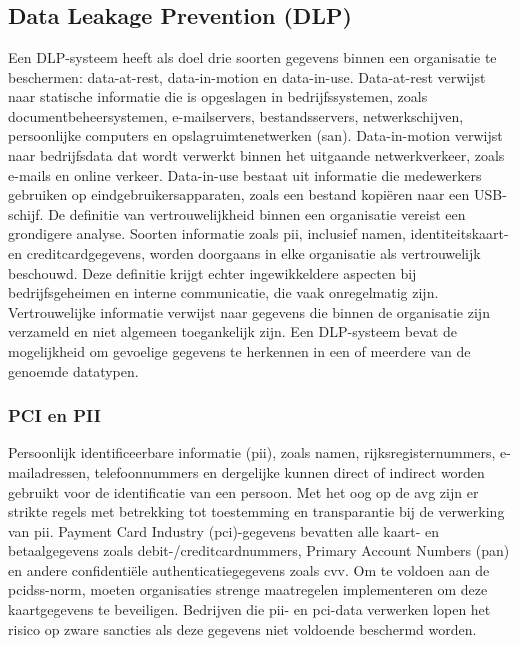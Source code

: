 \chapter{}%
\label{ch:stand-van-zaken}




\section{Data Leakage Prevention (DLP)}%

Een DLP-systeem heeft als doel drie soorten gegevens binnen een organisatie te beschermen: data-at-rest, data-in-motion en data-in-use. 
Data-at-rest verwijst naar statische informatie die is opgeslagen in bedrijfssystemen, zoals documentbeheersystemen, e-mailservers, bestandsservers, netwerkschijven, 
persoonlijke computers en opslagruimtenetwerken (\gls{san}). 
Data-in-motion verwijst naar bedrijfsdata dat wordt verwerkt binnen het uitgaande netwerkverkeer, zoals e-mails en online verkeer. 
Data-in-use bestaat uit informatie die medewerkers gebruiken op eindgebruikersapparaten, zoals een bestand kopiëren naar een USB-schijf. 
De definitie van vertrouwelijkheid binnen een organisatie vereist een grondigere analyse. 
Soorten informatie zoals \gls{pii}, inclusief namen, identiteitskaart- en creditcardgegevens, worden doorgaans in elke organisatie als vertrouwelijk beschouwd.
Deze definitie krijgt echter ingewikkeldere aspecten bij bedrijfsgeheimen en interne communicatie, die vaak onregelmatig zijn. 
Vertrouwelijke informatie verwijst naar gegevens die binnen de organisatie zijn verzameld en niet algemeen toegankelijk zijn. 
Een DLP-systeem bevat de mogelijkheid om gevoelige gegevens te herkennen in een of meerdere van de genoemde datatypen.

\subsection{PCI en PII}

Persoonlijk identificeerbare informatie (\gls{pii}), zoals namen, rijksregisternummers, e-mail\-adressen, telefoonnummers en dergelijke kunnen direct of indirect worden gebruikt voor de identificatie van een persoon. 
Met het oog op de \gls{avg} zijn er strikte regels met betrekking tot toestemming en transparantie bij de verwerking van \gls{pii}. 
Payment Card Industry (\gls{pci})-gegevens bevatten alle kaart- en betaalgegevens zoals debit-/creditcardnummers, Primary Account Numbers (\gls{pan}) en andere confidentiële authenticatiegegevens zoals \gls{cvv}. 
Om te voldoen aan de \gls{pcidss}-norm, 
moeten organisaties strenge maatregelen implementeren om deze kaartgegevens te beveiligen. 
Bedrijven die \gls{pii}- en \gls{pci}-data verwerken lopen het risico op zware sancties als deze gegevens niet voldoende beschermd worden.

